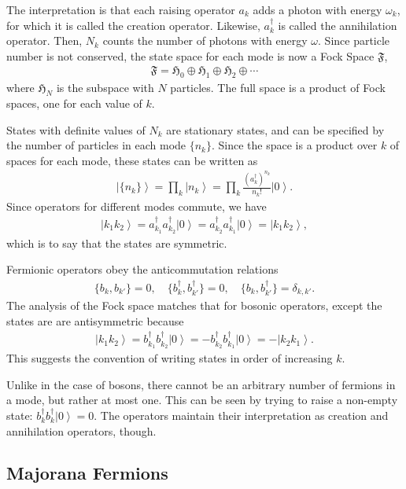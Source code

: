 \documentclass[12pt]{article} %
\newcommand{\om}{\omega}
\newcommand{\ket}[1]{\left|#1\right\rangle}
\begin{document}
The interpretation is that each raising operator $a_k$ adds a photon with energy $\om_k$, for which it is called the creation operator. Likewise, $a_k^\dag$ is called the annihilation operator. Then, $N_k$ counts the number of photons with energy $\om$. Since particle number is not conserved, the state space for each mode is now a  Fock Space $\mathfrak{F}$,
\begin{align}
\mathfrak{F} = \mathfrak{H}_0 \oplus \mathfrak{H}_1 \oplus \mathfrak{H}_2 
\oplus \cdots
\end{align}
where $\mathfrak{H}_N$ is the subspace with $N$ particles. The full space is a product of Fock spaces, one for each value of $k$.

States with definite values of $N_k$ are stationary states, and can be specified by the number of particles in each mode $\{n_k\}$. Since the space is a product over $k$ of spaces for each mode, these states can be written as
\begin{align}
\ket{\{n_k\}} = \prod_k\ket{n_k} = \prod_k\frac{(a_k^\dag)^{n_k}}{n_k!}\ket{0}.
\end{align}
Since operators for different modes commute, we have
\begin{align}
\ket{k_1k_2} = a^\dag_{k_1}a^\dag_{k_2}\ket{0} = a^\dag_{k_2} a^\dag_{k_1} \ket{0} = \ket{k_1k_2},
\end{align}
which is to say that the states are symmetric.

Fermionic operators obey the anticommutation relations
\begin{align}
\{b_k, b_{k'}\} = 0,\quad \{b^\dag_k, b^\dag_{k'}\} = 0,\quad \{b_k, b^\dag_{k'}\} = \delta_{k,k'}.
\end{align}
The analysis of the Fock space matches that for bosonic operators, except the states are are antisymmetric because
\begin{align}
\ket{k_1k_2} = b^\dag_{k_1}b^\dag_{k_2}\ket{0} = -b^\dag_{k_2}b^\dag_{k_1} 
	\ket{0} = -\ket{k_2k_1}.
\end{align}
This suggests the convention of writing states in order of increasing $k$.

Unlike in the case of bosons, there cannot be an arbitrary number of fermions in a mode, but rather at most one. This can be seen by trying to raise a non-empty state: $b_k^\dag b^\dag_k\ket{0} = 0$. The operators maintain their interpretation as creation and annihilation operators, though.

\subsection{Majorana Fermions} \emph{}
\end{document}
